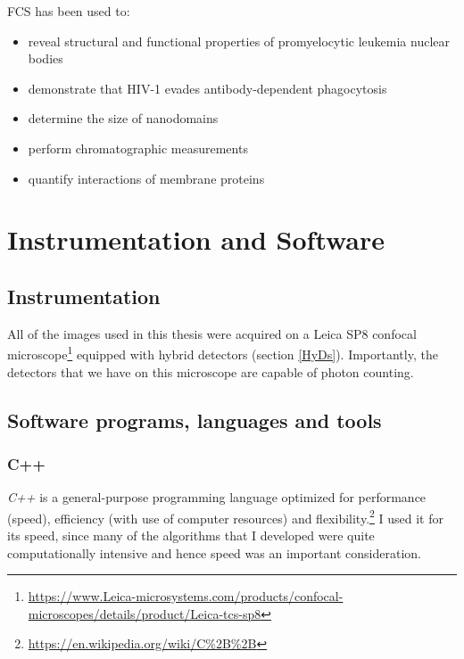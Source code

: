 \documentclass[12pt,]{book}
\providecommand{\tightlist}{%
  \setlength{\itemsep}{0pt}\setlength{\parskip}{0pt}}
\let\rmarkdownfootnote\footnote%
\def\footnote{\protect\rmarkdownfootnote}
\theoremstyle{definition}
\theoremstyle{definition}
\theoremstyle{definition}
\theoremstyle{remark}
\begin{document}
FCS has been used to:

\begin{itemize}
\tightlist
\item
  reveal structural and functional properties of promyelocytic leukemia
  nuclear bodies \citep{Hoischen}
\item
  demonstrate that HIV-1 evades antibody-dependent phagocytosis
  \citep{Gach}
\item
  determine the size of nanodomains \citep{Fenz}
\item
  perform chromatographic measurements \citep{Kisley}
\item
  quantify interactions of membrane proteins \citep{Ly}
\end{itemize}

\chapter{Instrumentation and
Software}\label{instrumentation-and-software}

\section{Instrumentation}\label{instrumentation}

All of the images used in this thesis were acquired on a Leica SP8
confocal microscope\footnote{\url{https://www.Leica-microsystems.com/products/confocal-microscopes/details/product/Leica-tcs-sp8}}
equipped with hybrid detectors (section \ref{HyDs}). Importantly, the
detectors that we have on this microscope are capable of photon
counting.

\section{Software programs, languages and
tools}\label{software-programs-languages-and-tools}

\subsection{C++}\label{c}

\emph{C++} \citep{cpp} is a general-purpose programming language
optimized for performance (speed), efficiency (with use of computer
resources) and flexibility.\footnote{\url{https://en.wikipedia.org/wiki/C\%2B\%2B}}
I used it for its speed, since many of the algorithms that I developed
were quite computationally intensive and hence speed was an important
consideration.
\end{document}
